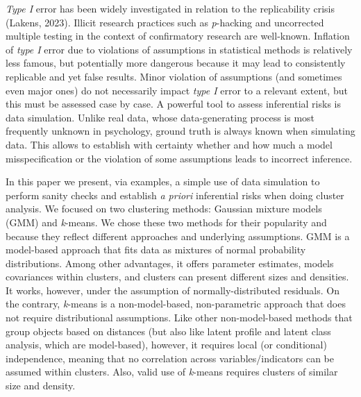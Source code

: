 \documentclass[
  man,floatsintext]{apa6}
\begin{document}
\emph{Type I} error has been widely investigated in relation to the replicability crisis (Lakens, 2023). Illicit research practices such as \emph{p}-hacking and uncorrected multiple testing in the context of confirmatory research are well-known. Inflation of \emph{type I} error due to violations of assumptions in statistical methods is relatively less famous, but potentially more dangerous because it may lead to consistently replicable and yet false results. Minor violation of assumptions (and sometimes even major ones) do not necessarily impact \emph{type I} error to a relevant extent, but this must be assessed case by case. A powerful tool to assess inferential risks is data simulation. Unlike real data, whose data-generating process is most frequently unknown in psychology, ground truth is always known when simulating data. This allows to establish with certainty whether and how much a model misspecification or the violation of some assumptions leads to incorrect inference.

In this paper we present, via examples, a simple use of data simulation to perform sanity checks and establish \emph{a priori} inferential risks when doing cluster analysis. We focused on two clustering methods: Gaussian mixture models (GMM) and \emph{k}-means. We chose these two methods for their popularity and because they reflect different approaches and underlying assumptions. GMM is a model-based approach that fits data as mixtures of normal probability distributions. Among other advantages, it offers parameter estimates, models covariances within clusters, and clusters can present different sizes and densities. It works, however, under the assumption of normally-distributed residuals. On the contrary, \emph{k}-means is a non-model-based, non-parametric approach that does not require distributional assumptions. Like other non-model-based methods that group objects based on distances (but also like latent profile and latent class analysis, which are model-based), however, it requires local (or conditional) independence, meaning that no correlation across variables/indicators can be assumed within clusters. Also, valid use of \emph{k}-means requires clusters of similar size and density.
\end{document}
